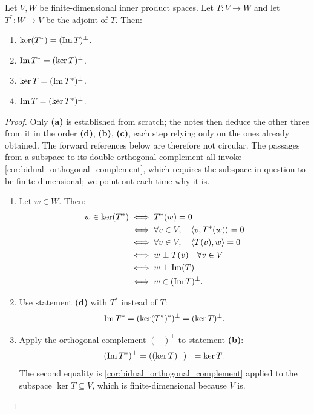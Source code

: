 \begin{lemma}
\label{lem:orthogonal_relations_adjoint_maps}
Let $V, W$ be finite-di\-men\-sional inner product spaces. Let $T \colon V \to W$ and let $T^* \colon W \to V$ be the adjoint of $T$. Then:
\begin{enumerate}[label=\textbf{(\alph*)}]
    \item $\ker(T^*) = (\operatorname{Im} T)^\perp$.
    \item $\operatorname{Im} T^* = (\ker T)^\perp$.
    \item $\ker T = (\operatorname{Im} T^*)^\perp$.
    \item $\operatorname{Im} T = (\ker T^*)^\perp$.
\end{enumerate}
\end{lemma}

\begin{proof}
Only \textbf{(a)} is established from scratch; the notes then deduce the other three from it in the order \textbf{(d)}, \textbf{(b)}, \textbf{(c)}, each step relying only on the ones already obtained. The forward references below are therefore not circular. The passages from a subspace to its double orthogonal complement all invoke \cref{cor:bidual_orthogonal_complement}, which requires the subspace in question to be finite-di\-men\-sional; we point out each time why it is.
\begin{enumerate}[label=\textbf{(\alph*)}]
    \item Let $w \in W$. Then:
    \begin{align*}
        w \in \ker(T^*) &\iff T^*(w) = 0 \\
        &\iff \forall v \in V, \quad \langle v, T^*(w) \rangle = 0 \\
        &\iff \forall v \in V, \quad \langle T(v), w \rangle = 0 \\
        &\iff w \perp T(v) \quad \forall v \in V \\
        &\iff w \perp \operatorname{Im}(T) \\
        &\iff w \in (\operatorname{Im} T)^\perp.
    \end{align*}

    \item Use statement \textbf{(d)} with $T^*$ instead of $T$:
    \[
        \operatorname{Im} T^* = (\ker (T^*)^*)^\perp = (\ker T)^\perp.
    \]

    \item Apply the orthogonal complement $(-)^\perp$ to statement \textbf{(b)}:
    \[
        (\operatorname{Im} T^*)^\perp = ((\ker T)^\perp)^\perp = \ker T.
    \]
    The second equality is \cref{cor:bidual_orthogonal_complement} applied to the subspace $\ker T \subseteq V$, which is finite-di\-men\-sional because $V$ is.


\end{enumerate}
\end{proof}
